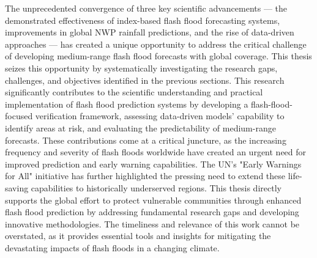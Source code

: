 The unprecedented convergence of three key scientific advancements — the demonstrated effectiveness of index-based flash flood forecasting systems, improvements in global NWP rainfall predictions, and the rise of data-driven approaches — has created a unique opportunity to address the critical challenge of developing medium-range flash flood forecasts with global coverage. This thesis seizes this opportunity by systematically investigating the research gaps, challenges, and objectives identified in the previous sections. This research significantly contributes to the scientific understanding and practical implementation of flash flood prediction systems by developing a flash-flood-focused verification framework, assessing data-driven models' capability to identify areas at risk, and evaluating the predictability of medium-range forecasts. These contributions come at a critical juncture, as the increasing frequency and severity of flash floods worldwide have created an urgent need for improved prediction and early warning capabilities. The UN's "Early Warnings for All" initiative has further highlighted the pressing need to extend these life-saving capabilities to historically underserved regions. This thesis directly supports the global effort to protect vulnerable communities through enhanced flash flood prediction by addressing fundamental research gaps and developing innovative methodologies. The timeliness and relevance of this work cannot be overstated, as it provides essential tools and insights for mitigating the devastating impacts of flash floods in a changing climate.

